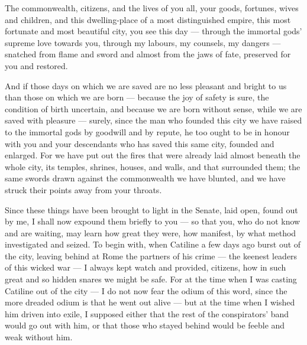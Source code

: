 
 The commonwealth, citizens, and the lives of you all, your goods, fortunes, wives and children, and this dwelling-place of a most distinguished empire, this most fortunate and most beautiful city, you see this day --- through the immortal gods' supreme love towards you, through my labours, my counsels, my dangers --- snatched from flame and sword and almost from the jaws of fate, preserved for you and restored.

 And if those days on which we are saved are no less pleasant and bright to us than those on which we are born --- because the joy of safety is sure, the condition of birth uncertain, and because we are born without sense, while we are saved with pleasure --- surely, since the man who founded this city we have raised to the immortal gods by goodwill and by repute, he too ought to be in honour with you and your descendants who has saved this same city, founded and enlarged. For we have put out the fires that were already laid almost beneath the whole city, its temples, shrines, houses, and walls, and that surrounded them; the same swords drawn against the commonwealth we have blunted, and we have struck their points away from your throats.

 Since these things have been brought to light in the Senate, laid open, found out by me, I shall now expound them briefly to you --- so that you, who do not know and are waiting, may learn how great they were, how manifest, by what method investigated and seized. To begin with, when Catiline a few days ago burst out of the city, leaving behind at Rome the partners of his crime --- the keenest leaders of this wicked war --- I always kept watch and provided, citizens, how in such great and so hidden snares we might be safe. For at the time when I was casting Catiline out of the city --- I do not now fear the odium of this word, since the more dreaded odium is that he went out alive --- but at the time when I wished him driven into exile, I supposed either that the rest of the conspirators' band would go out with him, or that those who stayed behind would be feeble and weak without him.

